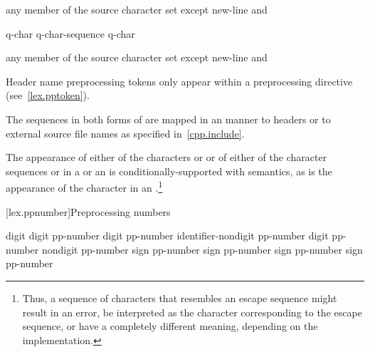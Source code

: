 \begin{bnf}
\br
    \textnormal{any member of the source character set except new-line and \terminal{>}}
\end{bnf}

\begin{bnf}
\br
    q-char\br
    q-char-sequence q-char
\end{bnf}

\begin{bnf}
\br
    \textnormal{any member of the source character set except new-line and }
\end{bnf}

\pnum
\begin{note} Header name preprocessing tokens only appear within a
 preprocessing directive (see~\ref{lex.pptoken}). \end{note}
The sequences in both forms of  are mapped in an
 manner to headers or to
external source file names as specified in~\ref{cpp.include}.

\pnum
The appearance of either of the characters  or \tcode{\textbackslash} or of
either of the character sequences \tcode{/*} or \tcode{//} in a
 or an 
is conditionally-supported with  semantics, as is the appearance of the character
 in an .\footnote{Thus, a sequence of characters
that resembles an escape sequence might result in an error, be interpreted as the
character corresponding to the escape sequence, or have a completely different meaning,
depending on the implementation.}%

[lex.ppnumber]{Preprocessing numbers}

%
\begin{bnf}
\br
    digit\br
     digit\br
    pp-number digit\br
    pp-number identifier-nondigit\br
    pp-number  digit\br
    pp-number  nondigit\br
    pp-number  sign\br
    pp-number  sign\br
    pp-number  sign\br
    pp-number  sign\br
    pp-number 
\end{bnf}

